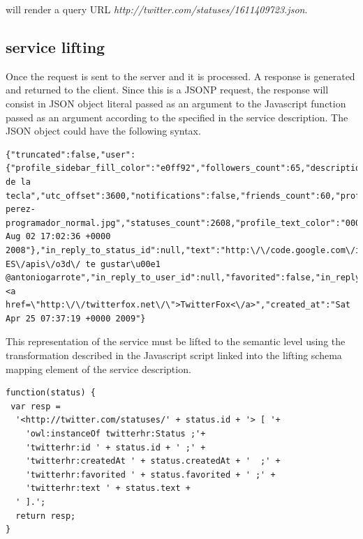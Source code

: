 will render a query URL \emph{http://twitter.com/statuses/1611409723.json}.

\subsection{service lifting}

Once the request is sent to the server and it is processed. A response is generated and returned to the client. Since this is a JSONP request, the response will consist in JSON object literal passed as an argument to the Javascript function passed as an argument according to the specified in the service description. The JSON object could have the following syntax.
\vspace{5 mm}
\begin{lstlisting}
{"truncated":false,"user":{"profile_sidebar_fill_color":"e0ff92","followers_count":65,"description":"mozo de la tecla","utc_offset":3600,"notifications":false,"friends_count":60,"profile_sidebar_border_color":"87bc44","following":false,"url":"http:\/\/blep.blogspot.com","name":"luisperez","favourites_count":1,"profile_background_color":"9ae4e8","protected":false,"profile_image_url":"http:\/\/s3.amazonaws.com\/twitter_production\/profile_images\/57635124\/luis-perez-programador_normal.jpg","statuses_count":2608,"profile_text_color":"000000","screen_name":"luisperez","profile_background_tile":false,"profile_background_image_url":"http:\/\/static.twitter.com\/images\/themes\/theme1\/bg.gif","profile_link_color":"0000ff","location":"Valladolid","id":16742706,"time_zone":"Madrid","created_at":"Sat Aug 02 17:02:36 +0000 2008"},"in_reply_to_status_id":null,"text":"http:\/\/code.google.com\/intl\/es-ES\/apis\/o3d\/ te gustar\u00e1 @antoniogarrote","in_reply_to_user_id":null,"favorited":false,"in_reply_to_screen_name":null,"id":1611409723,"source":"<a href=\"http:\/\/twitterfox.net\/\">TwitterFox<\/a>","created_at":"Sat Apr 25 07:37:19 +0000 2009"}
\end{lstlisting} \vspace{5 mm}

This representation of the service must be lifted to the semantic level using the transformation described in the Javascript script linked into the lifting schema mapping element of the service description.
\vspace{5 mm}
\begin{lstlisting}
function(status) {
 var resp = 
  '<http://twitter.com/statuses/' + status.id + '> [ '+
    'owl:instanceOf twitterhr:Status ;'+
    'twitterhr:id ' + status.id + ' ;' +
    'twitterhr:createdAt ' + status.createdAt + '  ;' +
    'twitterhr:favorited ' + status.favorited + ' ;' +
    'twitterhr:text ' + status.text +
  ' ].';
  return resp;
}
\end{lstlisting} \vspace{5 mm}

